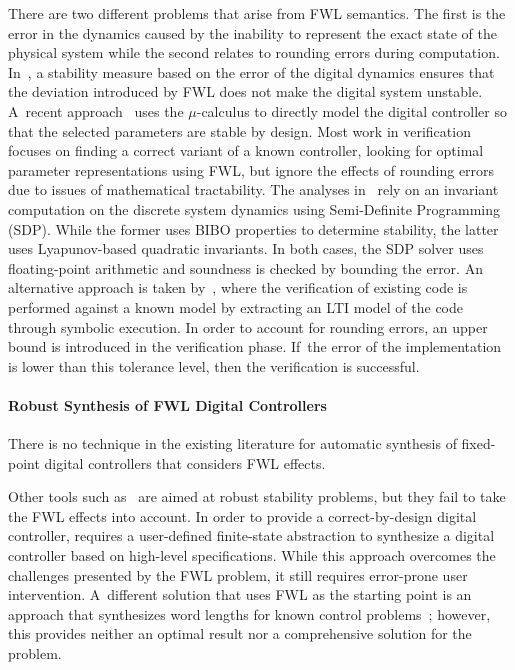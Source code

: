 \documentclass[final]{sig-alternate-05-2015}
\begin{document}
There are two different problems that arise from FWL semantics.  The first
is the error in the dynamics caused by the inability to represent the exact
state of the physical system while the second relates to rounding errors
during computation.  In~\cite{fialho1994stability}, a stability measure
based on the error of the digital dynamics ensures that the deviation
introduced by FWL does not make the digital system unstable.  A~recent
approach~\cite{DBLP:journals/automatica/WuLCC09} uses the $\mu$-calculus to
directly model the digital controller so that the selected parameters are
stable by design.  Most work in verification focuses on finding a correct
variant of a known controller, looking for optimal parameter representations
using FWL, but ignore the effects of rounding errors due to issues of
mathematical tractability.  The analyses in~\cite{DBLP:conf/hybrid/RouxJG15,
DBLP:conf/hybrid/WangGRJF16} rely on an invariant computation on the
discrete system dynamics using Semi-Definite Programming (SDP).  While the
former uses BIBO properties to determine stability, the latter uses
Lyapunov-based quadratic invariants.  In both cases, the SDP solver uses
floating-point arithmetic and soundness is checked by bounding the error. 
An alternative approach is taken by~\cite{park2016scalable}, where the
verification of existing code is performed against a known model by
extracting an LTI model of the code through symbolic execution.  In order to
account for rounding errors, an upper bound is introduced in the
verification phase.  If~the error of the implementation is lower than this
tolerance level, then the verification is successful.

\paragraph{Robust Synthesis of FWL Digital Controllers}

There is no technique in the existing literature for automatic synthesis of
fixed-point digital controllers that considers FWL effects.

Other tools such as~\cite{economakos2016automated} are aimed at
robust stability problems, but they fail to take the FWL effects into
account.  In order to provide a correct-by-design digital controller,
\cite{alur2016compositional} requires a user-defined finite-state
abstraction to synthesize a digital controller based on high-level
specifications.  While this approach overcomes the challenges presented by
the FWL problem, it still requires error-prone user intervention. 
A~different solution that uses FWL as the starting point is an approach that
synthesizes word lengths for known control problems~\cite{jha2013swati};
however, this provides neither an optimal result nor a comprehensive
solution for the problem.
\end{document}

